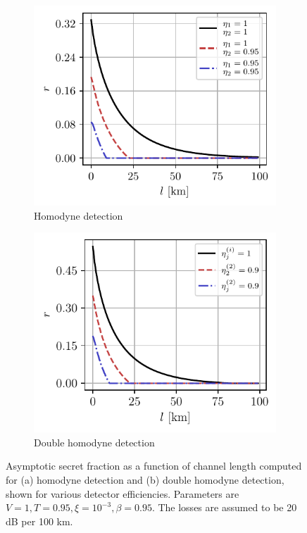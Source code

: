 \documentclass[%
reprint,
superscriptaddress,
 amsmath,amssymb,amsfonts,
 aps,
 pra,
 longbibliography
]{revtex4-2}
\begin{document}
\begin{figure}
    \centering
    \begin{subfigure}[]{.45\textwidth}
\includegraphics[width=\linewidth]{pics/qkd/hom/r(l).pdf}
\caption[]{Homodyne detection}
\label{fig:hom-r}
        \end{subfigure}
        \begin{subfigure}[]{.45\textwidth}
 \includegraphics[width=\linewidth]{pics/qkd/dhom/r(l).pdf}
\caption[]{Double homodyne detection}
\label{fig:dhom-r}
\end{subfigure}
\caption{Asymptotic secret fraction as a function of channel length computed for (a) homodyne detection and (b) double homodyne detection, shown for various detector efficiencies. Parameters are $V=1,T=0.95,\xi=10^{-3}, \beta=0.95$. The losses are assumed to be 20 dB per 100 km.
}
\label{fig:r-of-l-all}
\end{figure}
\end{document}
